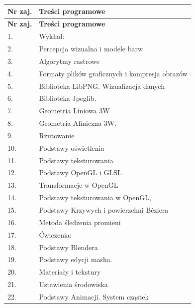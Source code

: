 \documentclass[12pt, a4paper]{article}
\newcommand{\thdrule}{\noalign{\global\setlength{\extrarowheight}{0pt}}}
\newcommand{\thdend}{\noalign{\global\setlength{\extrarowheight}{3pt}}}
\begin{document}
{\scriptsize
\begin{longtable}{m{1.5cm}m{14.5cm}}
\thdrule\toprule
\rowcolor{pjatkRed} {\color{white}\textbf{Nr zaj.}} & {\color{white}\textbf{Treści programowe}} \\
\midrule\thdend
\endfirsthead
\thdrule\toprule
\rowcolor{pjatkRed} {\color{white}\textbf{Nr zaj.}} & {\color{white}\textbf{Treści programowe}} \\
\midrule\thdend
\endhead
  \rowcolor{tableRowLight} 1. & Wykład: \\
  \rowcolor{tableRowAlt} 2. & Percepcja wizualna i modele barw \\
  \rowcolor{tableRowLight} 3. & Algorytmy rastrowe \\
  \rowcolor{tableRowAlt} 4. & Formaty plików graficznych i kompresja obrazów \\
  \rowcolor{tableRowLight} 5. & Biblioteka LibPNG. Wizualizacja danych \\
  \rowcolor{tableRowAlt} 6. & Biblioteka Jpeglib. \\
  \rowcolor{tableRowLight} 7. & Geometria Liniowa 3W \\
  \rowcolor{tableRowAlt} 8. & Geometria Afiniczna 3W. \\
  \rowcolor{tableRowLight} 9. & Rzutowanie \\
  \rowcolor{tableRowAlt} 10. & Podstawy oświetlenia \\
  \rowcolor{tableRowLight} 11. & Podstawy teksturowania \\
  \rowcolor{tableRowAlt} 12. & Podstawy OpenGL i GLSL \\
  \rowcolor{tableRowLight} 13. & Transformacje w OpenGL \\
  \rowcolor{tableRowAlt} 14. & Podstawy teksturowania w OpenGL, \\
  \rowcolor{tableRowLight} 15. & Podstawy Krzywych i powierzchni Béziera \\
  \rowcolor{tableRowAlt} 16. & Metoda śledzenia promieni \\
  \rowcolor{tableRowLight} 17. & Ćwiczenia: \\
  \rowcolor{tableRowAlt} 18. & Podstawy Blendera \\
  \rowcolor{tableRowLight} 19. & Podstawy edycji masha. \\
  \rowcolor{tableRowAlt} 20. & Materiały i tekstury \\
  \rowcolor{tableRowLight} 21. & Ustawienia środowiska \\
  \rowcolor{tableRowAlt} 22. & Podstawy Animacji. System cząstek \\

\end{longtable}}
\end{document}
